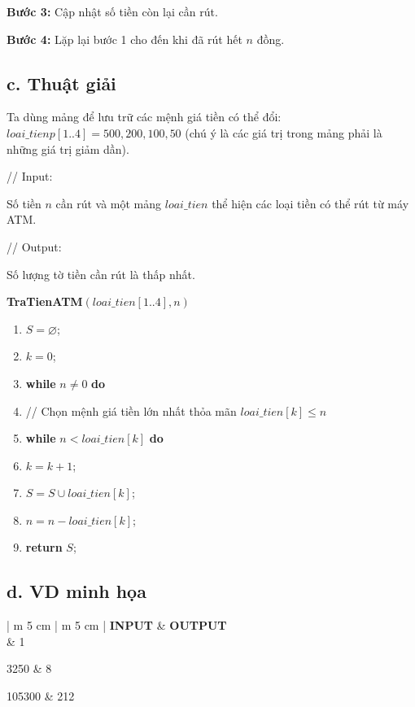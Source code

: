 \documentclass[12pt, a4paper, fleqn]{article}
\begin{document}
	\textbf{Bước 3:} Cập nhật số tiền còn lại cần rút.
	
	\textbf{Bước 4:} Lặp lại bước 1 cho đến khi đã rút hết $n$ đồng.
	
	\subsection*{c. Thuật giải}
	
		Ta dùng mảng để lưu trữ các mệnh giá tiền có thể đổi: $loai\_tienp[1..4] = { 500, 200, 100, 50 }$ (chú ý là các giá trị trong mảng phải là những giá trị giảm dần).
		
		// Input:
		
		Số tiền $n$ cần rút và một mảng $loai\_tien$ thể hiện các loại tiền có thể rút từ máy ATM.
		
		// Output:
		
		Số lượng tờ tiền cần rút là thấp nhất.
		
		\textbf{TraTienATM}$(loai\_tien[1..4], n)$
		\begin{enumerate}
			\item $S = \varnothing$;
			\item $k = 0$;
			\item \textbf{while} $n \neq 0$ \textbf{do}
			\item \qquad // Chọn mệnh giá tiền lớn nhất thỏa mãn $loai\_tien[k] \leq n$
			\item \qquad \textbf{while} $n < loai\_tien[k] $ \textbf{do}
			\item \qquad \qquad $k = k + 1$;
			\item \qquad $S = S \cup loai\_tien[k]$;
			\item \qquad $n = n - loai\_tien[k]$;
			\item \textbf{return} $S$;
		\end{enumerate}
	

	\subsection*{d. VD minh họa}
	
	{ \selectfont
		\begin{center}
			\begin{tabular}{ | m {5 cm} | m {5 cm} | } 
				\hline
				\textbf{INPUT} & \textbf{OUTPUT} \\
				 & 1 \\
				\hline
				
				3250 & 8 \\
				\hline
				
				105300 & 212 \\
				\hline
			\end{tabular}
		\end{center}
	}
	
\end{document}

